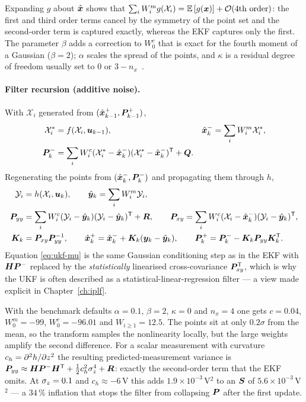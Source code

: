 Expanding $g$ about $\hat{\bm{x}}$ shows that
$\sum_i W_i^m g(\mathcal{X}_i) = \mathbb{E}\left[g(\bm{x})\right] + \mathcal{O}(\text{4th order})$: the first and
third order terms cancel by the symmetry of the point set and the second-order term is
captured exactly, whereas the EKF captures only the first. The parameter $\beta$ adds a
correction to $W_0^c$ that is exact for the fourth moment of a Gaussian ($\beta = 2$);
$\alpha$ scales the spread of the points, and $\kappa$ is a residual degree of freedom
usually set to $0$ or $3-n_x$~\cite{julier2004unscented}.

\paragraph{Filter recursion (additive noise).} With $\mathcal{X}_i$ generated from
$(\hat{\bm{x}}^{+}_{k-1},\bm{P}^{+}_{k-1})$,
\begin{align}
\mathcal{X}^*_i &= f(\mathcal{X}_i, \bm{u}_{k-1}), &
\hat{\bm{x}}^{-}_k &= \sum_i W_i^m \mathcal{X}^*_i, \label{eq:ukf-tu-mean}\\
\bm{P}^{-}_k &= \sum_i W_i^c (\mathcal{X}^*_i - \hat{\bm{x}}^{-}_k)(\mathcal{X}^*_i - \hat{\bm{x}}^{-}_k)^{\mathsf{T}} + \bm{Q}. &&
\label{eq:ukf-tu-cov}
\end{align}
Regenerating the points from $(\hat{\bm{x}}^{-}_k,\bm{P}^{-}_k)$ and propagating them through $h$,
\begin{align}
\mathcal{Y}_i &= h(\mathcal{X}_i, \bm{u}_k), \qquad \hat{\bm{y}}_k = \sum_i W_i^m \mathcal{Y}_i,
 \label{eq:ukf-ymean}\\
\bm{P}_{yy} &= \sum_i W_i^c (\mathcal{Y}_i-\hat{\bm{y}}_k)(\mathcal{Y}_i-\hat{\bm{y}}_k)^{\mathsf{T}} + \bm{R}, \qquad
\bm{P}_{xy} = \sum_i W_i^c (\mathcal{X}_i-\hat{\bm{x}}^{-}_k)(\mathcal{Y}_i-\hat{\bm{y}}_k)^{\mathsf{T}},
 \label{eq:ukf-pyy}\\
\bm{K}_k &= \bm{P}_{xy}\bm{P}_{yy}^{-1}, \qquad
\hat{\bm{x}}^{+}_k = \hat{\bm{x}}^{-}_k + \bm{K}_k(\bm{y}_k - \hat{\bm{y}}_k), \qquad
\bm{P}^{+}_k = \bm{P}^{-}_k - \bm{K}_k \bm{P}_{yy}\bm{K}_k^{\mathsf{T}}. \label{eq:ukf-mu}
\end{align}
Equation \eqref{eq:ukf-mu} is the same Gaussian conditioning step as in the EKF with
$\bm{H}\bm{P}^{-}$ replaced by the \emph{statistically} linearised cross-covariance $\bm{P}_{xy}^{\mathsf{T}}$,
which is why the UKF is often described as a statistical-linear-regression filter --- a view
made explicit in Chapter~\ref{ch:iplf}.

\begin{remark}\label{rm:ukf-w0}
With the benchmark defaults $\alpha=0.1$, $\beta=2$, $\kappa=0$ and $n_x=4$ one gets
$c = 0.04$, $W_0^m = -99$, $W_0^c = -96.01$ and $W_{i\ge1}=12.5$. The points sit at only
$0.2\sigma$ from the mean, so the transform samples the nonlinearity locally, but the large
weights amplify the second difference. For a scalar measurement with curvature
$c_h = \partial^2 h/\partial z^2$ the resulting predicted-measurement variance is
$\bm{P}_{yy} \approx \bm{H}\bm{P}^{-}\bm{H}^{\mathsf{T}} + \tfrac12 c_h^2\sigma_z^4 + \bm{R}$: exactly the
second-order term that the EKF omits. At $\sigma_z = 0.1$ and $c_h\approx -6$\,V this adds
$1.9\times10^{-3}$\,V$^2$ to an $\bm{S}$ of $5.6\times10^{-3}$\,V$^2$ --- a $34\,\%$ inflation
that stops the filter from collapsing $\bm{P}$ after the first update.
\end{remark}

